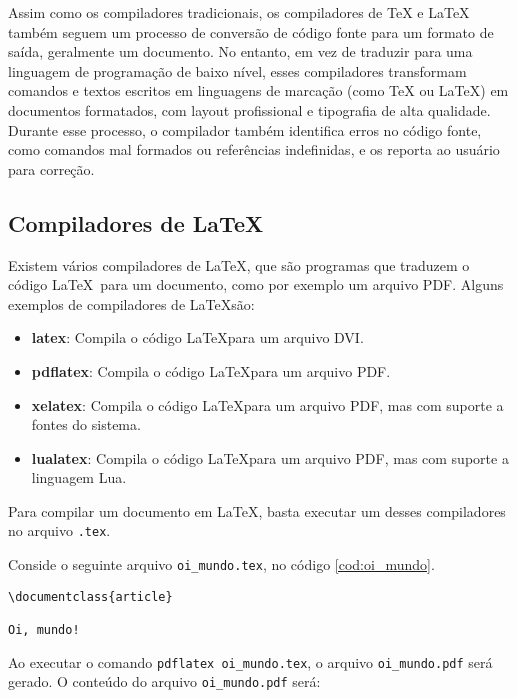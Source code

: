 Assim como os compiladores tradicionais, os compiladores de TeX e LaTeX também seguem um processo de conversão de código fonte para um formato de saída, geralmente um documento. No entanto, em vez de traduzir para uma linguagem de programação de baixo nível, esses compiladores transformam comandos e textos escritos em linguagens de marcação (como TeX ou LaTeX) em documentos formatados, com layout profissional e tipografia de alta qualidade. Durante esse processo, o compilador também identifica erros no código fonte, como comandos mal formados ou referências indefinidas, e os reporta ao usuário para correção.

\subsection{Compiladores de \LaTeX}

Existem vários compiladores de \LaTeX, que são programas que traduzem o código \LaTeX\ para um documento, como por exemplo um arquivo PDF. Alguns exemplos de compiladores de \LaTeX são:

\begin{itemize}
	\item \textbf{latex}: Compila o código \LaTeX para um arquivo DVI.
	\item \textbf{pdflatex}: Compila o código \LaTeX para um arquivo PDF.
	\item \textbf{xelatex}: Compila o código \LaTeX para um arquivo PDF, mas com suporte a fontes do sistema.
	\item \textbf{lualatex}: Compila o código \LaTeX para um arquivo PDF, mas com suporte a linguagem Lua.
\end{itemize}

Para compilar um documento em \LaTeX, basta executar um desses compiladores no arquivo \texttt{.tex}.

Conside o seguinte arquivo \texttt{oi\_mundo.tex}, no código \ref{cod:oi_mundo}.

\begin{lstlisting}[language={[latex]TeX}, caption={oi\_mundo.tex}, label=cod:oi_mundo]
\documentclass{article}

Oi, mundo!

\end{lstlisting}


Ao executar o comando \texttt{pdflatex oi\_mundo.tex}, o arquivo \texttt{oi\_mundo.pdf} será gerado. O conteúdo do arquivo \texttt{oi\_mundo.pdf} será:



